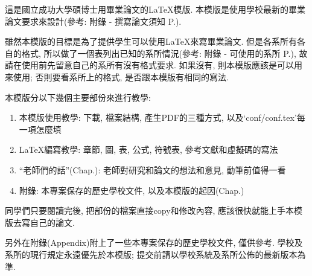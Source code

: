 
這是國立成功大學碩博士用畢業論文的LaTeX模版. 本模版是使用學校最新的畢業論文要求來設計(參考: 附錄 - 撰寫論文須知 P.).

雖然本模版的目標是為了提供學生可以使用LaTeX來寫畢業論文. 但是各系所有各自的格式, 所以做了一個表列出已知的系所情況(參考: 附錄 - 可使用的系所 P.), 故請在使用前先留意自己的系所有沒有格式要求. 如果沒有, 則本模版應該是可以用來使用; 否則要看系所上的格式, 是否跟本模版有相同的寫法.

本模版分以下幾個主要部份來進行教學:

\begin{enumerate}
  \item 本模版使用教學: 下載, 檔案結構, 產生PDF的三種方式, 以及`conf/conf.tex'每一項怎麼填
  \item LaTeX編寫教學: 章節, 圖, 表, 公式, 符號表, 參考文獻和虛擬碼的寫法
  \item ``老師們的話''(Chap.): 老師對研究和論文的想法和意見, 動筆前值得一看
  \item 附錄: 本專案保存的歷史學校文件, 以及本模版的起因(Chap.)
\end{enumerate}

同學們只要閱讀完後, 把部份的檔案直接copy和修改內容, 應該很快就能上手本模版去寫自己的論文.

另外在附錄(Appendix)附上了一些本專案保存的歷史學校文件, 僅供參考. 學校及系所的現行規定永遠優先於本模版; 提交前請以學校系統及系所公佈的最新版本為準.

\newpage

